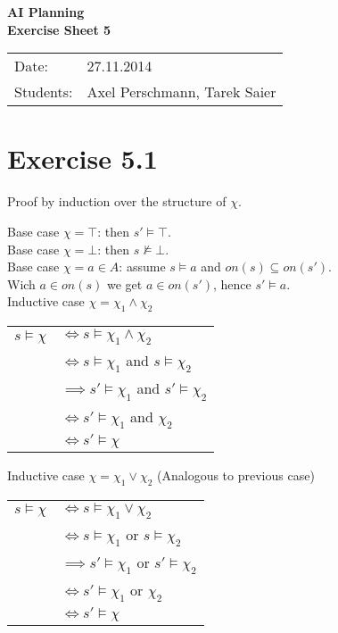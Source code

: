 \documentclass[11pt,a4paper]{article}
\begin{document}
\begin{center}
\Huge{\textbf{AI Planning}}\\
\LARGE{\textbf{Exercise Sheet 5}}
\end{center}
\vspace{2cm}
\begin{tabular}{ll}
Date: & 27.11.2014\\
Students: & Axel Perschmann, Tarek Saier
\end{tabular}

\section*{Exercise 5.1}
Proof by induction over the structure of $\chi$.

Base case $\chi = \top$: then $s' \models \top$.\\
Base case $\chi = \bot$: then $s \not\models \bot$.\\

Base case $\chi = a \in A$: assume $s \models a$ and $on(s) \subseteq on(s')$. \\
Wich $a \in on(s)$ we get $a \in on(s')$, hence $s' \models a$.\\

Inductive case $\chi = \chi_1 \land \chi_2$

\begin{tabular}{l l}
$s \models \chi$ & $\iff  s \models \chi_1 \land \chi_2$ \\
 & $\iff  s \models \chi_1$ and $s \models \chi_2$\\
 & $\implies s' \models \chi_1$ and $s' \models \chi_2$\\
 & $\iff s' \models \chi_1$ and $\chi_2$ \\
 & $\iff s' \models \chi$ 
\end{tabular}
 
Inductive case $\chi = \chi_1 \lor \chi_2$ (Analogous to previous case)

\begin{tabular}{l l}
$s \models \chi$ & $\iff  s \models \chi_1 \lor \chi_2$ \\
 & $\iff  s \models \chi_1$ or $s \models \chi_2$\\
 & $\implies s' \models \chi_1$ or $s' \models \chi_2$\\
 & $\iff s' \models \chi_1$ or $\chi_2$ \\
 & $\iff s' \models \chi$ 
\end{tabular}
                
\end{document}
